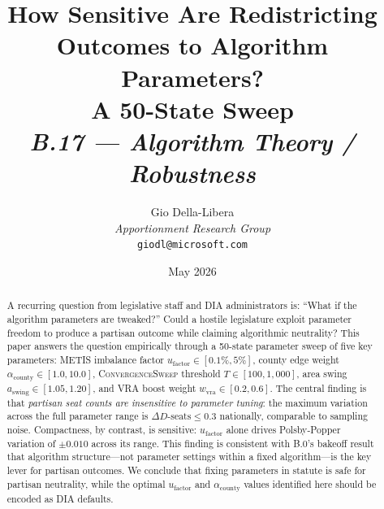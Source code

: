 \documentclass[12pt]{article}
\title{%
  \textbf{How Sensitive Are Redistricting Outcomes to Algorithm Parameters?}\\
  \textbf{A 50-State Sweep}\\[0.8em]
  \normalsize\textit{B.17 --- Algorithm Theory / Robustness}%
}
\author{%
  Gio Della-Libera\\
  \textit{Apportionment Research Group}\\
  \small\texttt{giodl@microsoft.com}
}
\date{May 2026}
\newcommand{\cs}{\textsc{ConvergenceSweep}}
\newcommand{\ufactor}{\ensuremath{u_{\mathrm{factor}}}}
\newcommand{\acounty}{\ensuremath{\alpha_{\mathrm{county}}}}
\newcommand{\aswing}{\ensuremath{a_{\mathrm{swing}}}}
\newcommand{\wvra}{\ensuremath{w_{\mathrm{vra}}}}
\begin{document}
\maketitle

\begin{abstract}
\noindent
A recurring question from legislative staff and DIA administrators is:
``What if the algorithm parameters are tweaked?''
Could a hostile legislature exploit parameter freedom to produce
a partisan outcome while claiming algorithmic neutrality?
This paper answers the question empirically through a 50-state
parameter sweep of five key parameters: METIS imbalance factor
$\ufactor \in [0.1\%, 5\%]$, county edge weight $\acounty \in [1.0, 10.0]$,
\cs{} threshold $T \in [100, 1{,}000]$, area swing $\aswing \in [1.05, 1.20]$,
and VRA boost weight $\wvra \in [0.2, 0.6]$.
The central finding is that \emph{partisan seat counts are insensitive to
parameter tuning}: the maximum variation across the full parameter range is
$\Delta D\text{-seats} \leq 0.3$ nationally, comparable to sampling noise.
Compactness, by contrast, is sensitive: $\ufactor$ alone drives Polsby-Popper
variation of $\pm 0.010$ across its range.
This finding is consistent with B.0's bakeoff result that
algorithm structure---not parameter settings within a fixed algorithm---is
the key lever for partisan outcomes.
We conclude that fixing parameters in statute is safe for partisan
neutrality, while the optimal $\ufactor$ and $\acounty$ values
identified here should be encoded as DIA defaults.
\end{abstract}

\tableofcontents
\newpage











\end{document}
